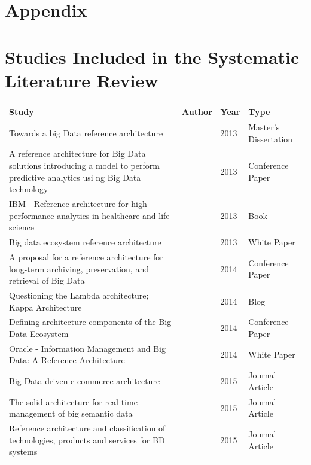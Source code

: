 \documentclass{bmcart}
\begin{document}
\section*{Appendix}
\hspace{1cm}


\section{Studies Included in the Systematic Literature Review} \label{appendixA:SLR}
\begin{longtable}{|p{5cm} | p{1cm}  | p{1cm} | p{3.4cm}|}
    \hline
    Study  & Author & Year & Type \\ [0.5ex]
    \hline
    Towards a big Data reference architecture  & \cite{Maier}& 2013 & Master's Dissertation \\
    \hline
    A reference architecture for Big Data solutions introducing a model to perform predictive analytics usi ng Big Data technology  & \cite{geerdink2013reference}  & 2013 & Conference Paper \\
    \hline
    IBM - Reference architecture for high performance analytics in healthcare and life science  & \cite{quintero2019ibm} & 2013 & Book \\ [1ex]
    \hline
    Big data ecosystem reference architecture  &
    \cite{levin2013big} & 2013 & White Paper \\ [1ex]
    \hline
    A proposal for a reference architecture for long-term archiving, preservation, and retrieval of Big Data  & \cite{viana2014proposal}  & 2014 & Conference Paper \\
    \hline
    Questioning the Lambda architecture; Kappa Architecture  & \cite{kreps2014questioning}  & 2014 & Blog \\
    \hline
    Defining architecture components of the Big Data Ecosystem  & \cite{demchenko2014defining} & 2014 & Conference Paper   \\ [1ex]
    \hline
    Oracle - Information Management and Big Data: A Reference Architecture   &
    \cite{cackett2013information} & 2014 & White Paper \\ [1ex]
    \hline
    Big Data driven e-commerce architecture   & \cite{ghandour2015big} & 2015 & Journal Article \\ [1ex]
    \hline
    The solid architecture for real-time management of big semantic data & \cite{martinez2015solid} & 2015 &  Journal Article \\ [1ex]
    \hline
    Reference architecture and classification of technologies, products and services for BD systems  & \cite{paakkonen2015reference}  & 2015 & Journal Article \\ [1ex]

\end{longtable}
\end{document}
